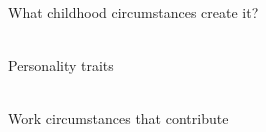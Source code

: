 \documentclass[aspectratio=169]{beamer}
\begin{document}
\begin{frame}
  \begin{center}
    \Huge What childhood circumstances create it?
    \\ \small \cite{sakulku11}
    \\ \small \cite{langford93}
  \end{center}
\end{frame}

\begin{frame}
  \begin{center}
    \Huge Personality traits
    \small
    \\ \small \cite{hh15}
    \\ \small \cite{sakulku11}
  \end{center}
\end{frame}

\begin{frame}
  \begin{center}
    \Huge Work circumstances that contribute
    \small
    \\ \small \cite{hh15}
    \\ \small \cite{clark14}
  \end{center}
\end{frame}
\end{document}
